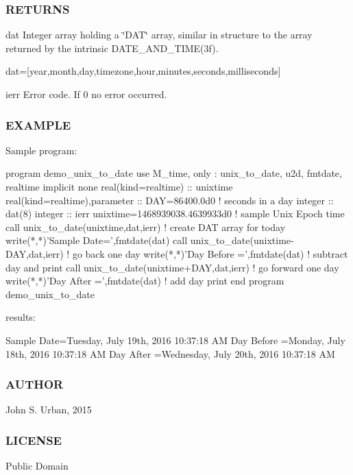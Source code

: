 \subsubsection*{R\+E\+T\+U\+R\+NS}

dat Integer array holding a \char`\"{}\+D\+A\+T\char`\"{} array, similar in structure to the array returned by the intrinsic D\+A\+T\+E\+\_\+\+A\+N\+D\+\_\+\+T\+I\+M\+E(3f).

dat=\mbox{[}year,month,day,timezone,hour,minutes,seconds,milliseconds\mbox{]}

ierr Error code. If 0 no error occurred.

\subsubsection*{E\+X\+A\+M\+P\+LE}

\begin{DoxyVerb}Sample program:

 program demo_unix_to_date
 use M_time, only : unix_to_date, u2d, fmtdate, realtime
 implicit none
 real(kind=realtime)           :: unixtime
 real(kind=realtime),parameter :: DAY=86400.0d0 ! seconds in a day
 integer                       :: dat(8)
 integer                       :: ierr
    unixtime=1468939038.4639933d0            ! sample Unix Epoch time
    call unix_to_date(unixtime,dat,ierr)     ! create DAT array for today
    write(*,*)'Sample Date=',fmtdate(dat)
    call unix_to_date(unixtime-DAY,dat,ierr) ! go back one day
    write(*,*)'Day Before =',fmtdate(dat)    ! subtract day and print
    call unix_to_date(unixtime+DAY,dat,ierr) ! go forward one day
    write(*,*)'Day After  =',fmtdate(dat)    ! add day print
 end program demo_unix_to_date

results:

 Sample Date=Tuesday, July 19th, 2016 10:37:18 AM
 Day Before =Monday, July 18th, 2016 10:37:18 AM
 Day After  =Wednesday, July 20th, 2016 10:37:18 AM
\end{DoxyVerb}


\subsubsection*{A\+U\+T\+H\+OR}

John S. Urban, 2015 \subsubsection*{L\+I\+C\+E\+N\+SE}

Public Domain 

